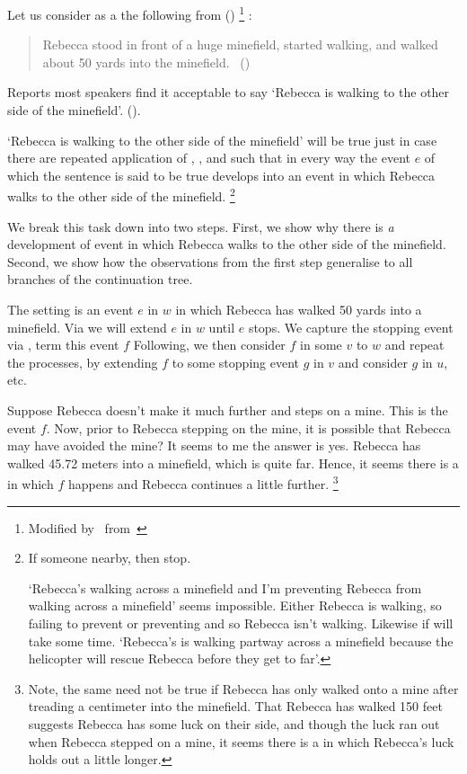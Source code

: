 \begin{note}
  Let us consider as a  the following  from \citeauthor{Engelberg:1999vi} (\citeyear{Engelberg:1999vi})%
  \footnote{
    Modified by~\citeauthor{Engelberg:1999vi} from~\textcite[475]{Asher:1992ug}
  }%
  :
  \begin{quote}
    Rebecca stood in front of a huge minefield, started walking, and walked about 50 yards into the minefield.%
    \mbox{ }\hfill\mbox{(\citeyear[49]{Engelberg:1999vi})}
  \end{quote}
  Reports most speakers find it acceptable to say `Rebecca is walking to the other side of the minefield'.
  (\citeyear[49]{Engelberg:1999vi}).

  `Rebecca is walking to the other side of the minefield' will be true just in case there are repeated application of \AlgAC{}, \AlgGetStops{}, and \AlgFindBranches{} such that in every way the event \(e\) of which the sentence is said to be true develops into an event in which Rebecca walks to the other side of the minefield.%
  \footnote{
    If someone nearby, then stop.

    `Rebecca's walking across a minefield and I'm preventing Rebecca from walking across a minefield' seems impossible.
    Either Rebecca is walking, so failing to prevent or preventing and so Rebecca isn't walking.
    Likewise if will take some time.
    `Rebecca's is walking partway across a minefield because the helicopter will rescue Rebecca before they get to far'.
  }

  We break this task down into two steps.
  First, we show why there is \emph{a} development of event in which Rebecca walks to the other side of the minefield.
  Second, we show how the observations from the first step generalise to all branches of the continuation tree.

  The setting is an event \(e\) in \(w\) in which Rebecca has walked 50 yards into a minefield.
  Via \AlgAC{} we will extend \(e\) in \(w\) until \(e\) stops.
  We capture the stopping event via \AlgGetStops{}, term this event \(f\)
  Following, we then consider \(f\) in some  \(v\) to \(w\) and repeat the processes, by extending \(f\) to some stopping event \(g\) in \(v\) and consider \(g\) in \(u\), etc.

  Suppose Rebecca doesn't make it much further and steps on a mine.
  This is the event \(f\).
  Now, prior to Rebecca stepping on the mine, it is possible that Rebecca may have avoided the mine?
  It seems to me the answer is yes.
  Rebecca has walked 45.72 meters into a minefield, which is quite far.
  Hence, it seems there is a \closeW{} in which \(f\) happens and Rebecca continues a little further.%
  \footnote{
    Note, the same need not be true if Rebecca has only walked onto a mine after treading a centimeter into the minefield.
    That Rebecca has walked 150 feet suggests Rebecca has some luck on their side, and though the luck ran out when Rebecca stepped on a mine, it seems there is a  in which Rebecca's luck holds out a little longer.
  }


\end{note}
